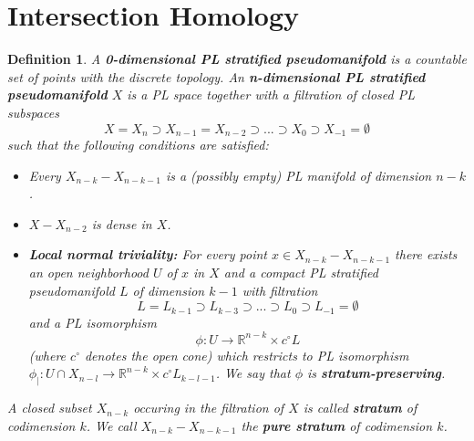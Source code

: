 \documentclass[11pt]{book}
\newtheorem{definition}{Definition}
\begin{document}
\section{Intersection Homology}

\begin{definition}
A \textbf{0-dimensional PL stratified pseudomanifold} is a countable set of points with the discrete topology. An \textbf{n-dimensional PL stratified pseudomanifold} $X$ is a PL space together with a filtration of closed PL subspaces
\begin{equation*}
X=X_n \supset X_{n-1} = X_{n-2} \supset ... \supset X_0 \supset X_{-1} = \emptyset
\end{equation*}
such that the following conditions are satisfied:
\begin{itemize}
\item Every $X_{n-k} - X_{n-k-1}$ is a (possibly empty) PL manifold of dimension $n-k$.
\item $X-X_{n-2}$ is dense in $X$.
\item \textbf{Local normal triviality:} For every point $x \in X_{n-k} - X_{n-k-1}$ there exists an open neighborhood $U$ of $x$  in $X$ and a compact PL stratified pseudomanifold $L$ of dimension $k-1$ with filtration
\begin{equation*}
L = L_{k-1} \supset L_{k-3} \supset ... \supset L_0 \supset L_{-1}= \emptyset
\end{equation*}
and a PL isomorphism
\begin{equation*}
\phi : U \to \mathbb{R}^{n-k} \times c^{\circ} L
\end{equation*}
(where $c^{\circ}$ denotes the open cone) which restricts to PL isomorphism $\phi_| : U \cap X_{n-l} \to \mathbb{R}^{n-k} \times c^{\circ} L_{k-l-1}$. We say that $\phi$ is \textbf{stratum-preserving}.
\end{itemize}
A closed subset $X_{n-k}$ occuring in the filtration of $X$ is called \textbf{stratum} of codimension $k$. We call $X_{n-k}-X_{n-k-1}$ the \textbf{pure stratum} of codimension $k$.
\end{definition}
\end{document}

